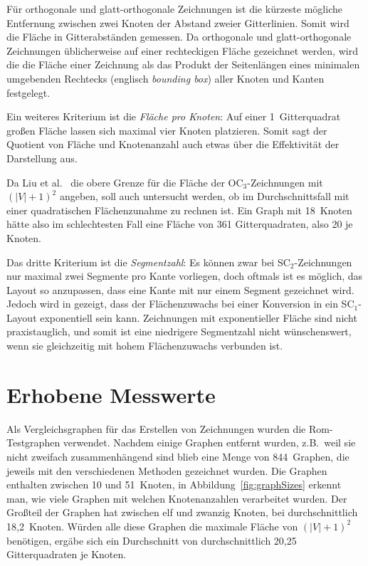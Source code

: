 \documentclass[a4paper]{scrreprt}
\theoremstyle{definition}
\begin{document}
Für orthogonale und glatt-orthogonale Zeichnungen ist die kürzeste mögliche Entfernung zwischen zwei Knoten der Abstand zweier Gitterlinien. Somit wird die Fläche in Gitterabständen gemessen. Da orthogonale und glatt-orthogonale Zeichnungen üblicherweise auf einer rechteckigen Fläche gezeichnet werden, wird die die Fläche einer Zeichnung als das Produkt der Seitenlängen eines minimalen umgebenden Rechtecks (englisch \emph{bounding box}) aller Knoten und Kanten festgelegt.

Ein weiteres Kriterium ist die \emph{Fläche pro Knoten}: Auf einer 1~Gitterquadrat großen Fläche lassen sich maximal vier Knoten platzieren. Somit sagt der Quotient von Fläche und Knotenanzahl auch etwas über die Effektivität der Darstellung aus.

Da Liu et al.~\cite{liu+etal-98} die obere Grenze für die Fläche der OC$_3$-Zeichnungen mit $(|V|+1)^2$ angeben, soll auch untersucht werden, ob im Durchschnittsfall mit einer quadratischen Flächenzunahme zu rechnen ist. Ein Graph mit 18~Knoten hätte also im schlechtesten Fall eine Fläche von 361 Gitterquadraten, also 20 je Knoten.

Das dritte Kriterium ist die \emph{Segmentzahl}: Es können zwar bei SC$_2$-Zeichnungen nur maximal zwei Segmente pro Kante vorliegen, doch oftmals ist es möglich, das Layout so anzupassen, dass eine Kante mit nur einem Segment gezeichnet wird.  Jedoch wird in \cite{bekos-13} gezeigt, dass der Flächenzuwachs bei einer Konversion in ein SC$_1$-Layout exponentiell sein kann. Zeichnungen mit exponentieller Fläche sind nicht praxistauglich, und somit ist eine niedrigere Segmentzahl nicht wünschenswert, wenn sie gleichzeitig mit hohem Flächenzuwachs verbunden ist.

\section{Erhobene Messwerte}

Als Vergleichsgraphen für das Erstellen von Zeichnungen wurden die Rom-Testgraphen verwendet. Nachdem einige Graphen entfernt wurden, z.B.\ weil sie nicht zweifach zusammenhängend sind blieb eine Menge von 844~Graphen, die jeweils mit den verschiedenen Methoden gezeichnet wurden. Die Graphen enthalten zwischen 10 und 51~Knoten, in Abbildung~\ref{fig:graphSizes} erkennt man, wie viele Graphen mit welchen Knotenanzahlen verarbeitet wurden. Der Großteil der Graphen hat zwischen elf und zwanzig Knoten, bei durchschnittlich 18,2~Knoten. Würden alle diese Graphen die maximale Fläche von $(|V|+1)^2$ benötigen, ergäbe sich ein Durchschnitt von durchschnittlich 20,25 Gitterquadraten je Knoten.
\end{document}
